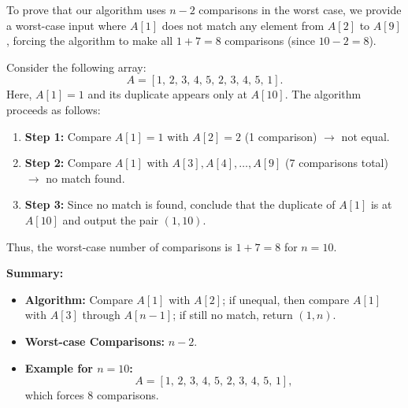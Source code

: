 \documentclass[11pt]{article}
\begin{document}
    To prove that our algorithm uses \( n-2 \) comparisons in the worst case, we provide a worst-case input where \( A[1] \) does not match any element from \( A[2] \) to \( A[9] \), forcing the algorithm to make all \( 1 + 7 = 8 \) comparisons (since \( 10-2 = 8 \)).
    
    Consider the following array:
    \[
    A = [1,\, 2,\, 3,\, 4,\, 5,\, 2,\, 3,\, 4,\, 5,\, 1].
    \]
    Here, \( A[1] = 1 \) and its duplicate appears only at \( A[10] \). The algorithm proceeds as follows:
    \begin{enumerate}
        \item \textbf{Step 1:} Compare \( A[1] = 1 \) with \( A[2] = 2 \) (1 comparison) \(\rightarrow\) not equal.
        \item \textbf{Step 2:} Compare \( A[1] \) with \( A[3], A[4], \dots, A[9] \) (7 comparisons total) \(\rightarrow\) no match found.
        \item \textbf{Step 3:} Since no match is found, conclude that the duplicate of \( A[1] \) is at \( A[10] \) and output the pair \((1,10)\).
    \end{enumerate}
    
    Thus, the worst-case number of comparisons is \( 1 + 7 = 8 \) for \( n = 10 \).
    
    \bigskip
    
    \textbf{Summary:}
    \begin{itemize}
        \item \textbf{Algorithm:} Compare \( A[1] \) with \( A[2] \); if unequal, then compare \( A[1] \) with \( A[3] \) through \( A[n-1] \); if still no match, return \((1,n)\).
        \item \textbf{Worst-case Comparisons:} \( n-2 \).
        \item \textbf{Example for \( n = 10 \):} 
        \[
        A = [1,\, 2,\, 3,\, 4,\, 5,\, 2,\, 3,\, 4,\, 5,\, 1],
        \]
        which forces \( 8 \) comparisons.
    \end{itemize}
    
\end{document}
